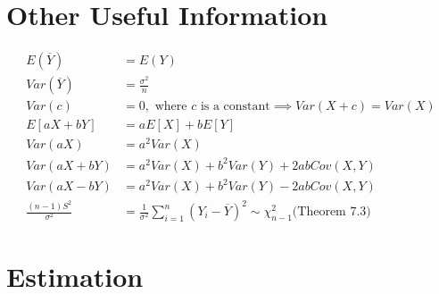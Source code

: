 \documentclass[12 pt]{article}
\theoremstyle{definition}
\begin{document}
        \section*{Other Useful Information}
        \begin{align*}
          E(\overline{Y}) & = E(Y)
          \\ Var(\overline{Y}) & = \frac{\sigma^2}{n}
          \\ Var(c) & = 0, \text{ where }c \text{ is a constant} \implies Var(X+c) = Var(X)
          \\ E[aX+bY] & = aE[X]+bE[Y]
          \\ Var(aX) & = a^2Var(X)
          \\ Var(aX+bY) & = a^2Var(X)+b^2Var(Y) + 2 abCov(X,Y)
          \\ Var(aX-bY) & = a^2Var(X)+b^2Var(Y) - 2 abCov(X,Y)
          \\ \frac{(n-1)S^2}{\sigma^2} & =
                                           \frac{1}{\sigma^2}\sum_{i=1}^n(Y_i
                                           - \overline{Y})^2 \sim
                                           \chi^2_{n-1} \text{
                                           (Theorem 7.3)}
        \end{align*}
        \setcounter{section}{7}
        \section{Estimation}
\end{document}
